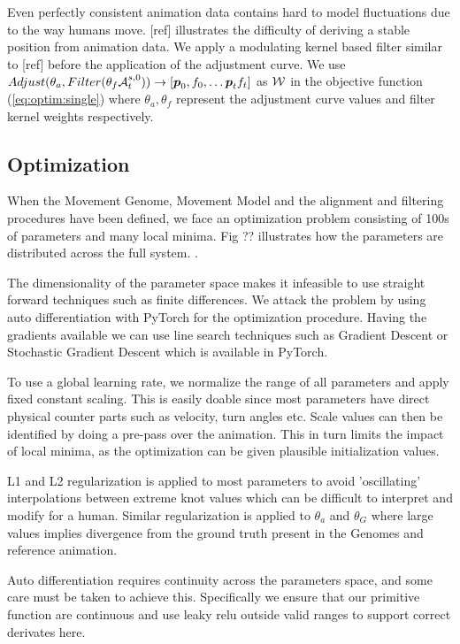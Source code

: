 Even perfectly consistent animation data contains hard to model fluctuations due to the way humans move. [ref] illustrates the difficulty of deriving a stable position from animation data. We apply a modulating kernel based filter similar to [ref] before the application of the adjustment curve. We use $Adjust(\theta_a,Filter(\theta_f\mathcal{A}^{s,0}_t))\rightarrow{}[\boldsymbol{p }_0,f_0, \ldots \boldsymbol{p }_tf_t]$ as $\mathcal{W}$ in the objective function (\ref{eq:optim:single}) where $\theta_a, \theta_f$ represent the adjustment curve values and filter kernel weights respectively.

\subsection{Optimization}
When the Movement Genome, Movement Model and the alignment and filtering procedures have been defined, we face an optimization problem consisting of 100s of parameters and many local minima. Fig ?? illustrates how the parameters are distributed across the full system. .

The dimensionality of the parameter space makes it infeasible to use straight forward techniques such as finite differences. We attack the problem by using auto differentiation with PyTorch for the optimization procedure. Having the gradients available we can use line search techniques such as Gradient Descent or Stochastic Gradient Descent which is available in PyTorch.

To use a global learning rate, we normalize the range of all parameters and apply fixed constant scaling. This is easily doable since most parameters have direct physical counter parts such as velocity, turn angles etc. Scale values can then be identified by doing a pre-pass over the animation. This in turn limits the impact of local minima, as the optimization can be given plausible initialization values.

L1 and L2 regularization is applied to most parameters to avoid 'oscillating' interpolations between extreme knot values which can be difficult to interpret and modify for a human. Similar regularization is applied to $\theta_a$ and $\theta_G$ where large values implies divergence from the ground truth present in the Genomes and reference animation.

Auto differentiation requires continuity across the parameters space, and some care must be taken to achieve this. Specifically we ensure that our primitive function are continuous and use leaky relu outside valid ranges to support correct derivates here. 
